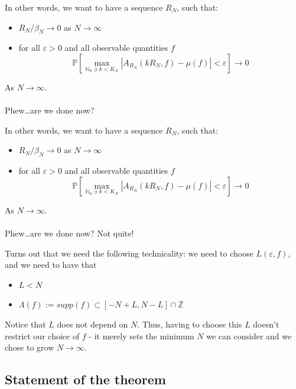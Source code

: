\documentclass{beamer}
\begin{document}
\begin{frame}
    In other words, we want to have a sequence $R_N$, such that:
    \begin{itemize}
        \item $R_N / \beta_N \rightarrow 0$ as $N \rightarrow \infty$
        \item for all $\varepsilon > 0$ and all observable quantities $f$
        \[
            \mathbb{P}\left[ \max_{\mathbb{N}_0 \ni k < K_N}|A_{R_N}(kR_N, f) - \mu(f)| < \varepsilon\right] \rightarrow 0
        \]
    \end{itemize}

    As $N \rightarrow \infty$. \\~\\
    Phew\ldots are we done now?
\end{frame}

\begin{frame}
    In other words, we want to have a sequence $R_N$, such that:
    \begin{itemize}
        \item $R_N / \beta_N \rightarrow 0$ as $N \rightarrow \infty$
        \item for all $\varepsilon > 0$ and all observable quantities $f$
        \[
            \mathbb{P}\left[ \max_{\mathbb{N}_0 \ni k < K_N}|A_{R_N}(kR_N, f) - \mu(f)| < \varepsilon\right] \rightarrow 0
        \]
    \end{itemize}

    As $N \rightarrow \infty$. \\~\\
    Phew\ldots are we done now? Not quite!
\end{frame}

\begin{frame}
    Turns out that we need the following technicality: we need to choose $L(\varepsilon, f)$, and we need to have that
    \begin{itemize}
        \item $L < N$
        \item $\Lambda(f) := supp(f) \subset [-N + L, N - L] \cap \mathbb{Z}$
    \end{itemize}
     Notice that $L$ does not depend on $N$. Thus, having to choose this $L$ doesn't restrict our choice of $f$ - it merely sets the minimum
     $N$ we can consider and we chose to grow $N \rightarrow \infty$.
\end{frame}

\subsection{Statement of the theorem} %
\end{document}
